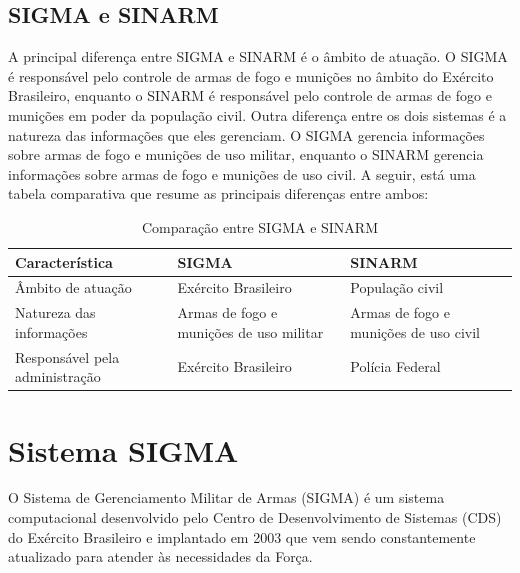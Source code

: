 \subsection{SIGMA e SINARM}
A principal diferença entre SIGMA e SINARM é o âmbito de atuação. O SIGMA é responsável pelo controle de armas de fogo e munições no âmbito do Exército Brasileiro, enquanto o SINARM é responsável pelo controle de armas de fogo e munições em poder da população civil.
Outra diferença entre os dois sistemas é a natureza das informações que eles gerenciam. O SIGMA gerencia informações sobre armas de fogo e munições de uso militar, enquanto o SINARM gerencia informações sobre armas de fogo e munições de uso civil.
A seguir, está uma tabela comparativa que resume as principais diferenças entre ambos: 
\begin{table}[ht]
	\centering
	\caption{Comparação entre SIGMA e SINARM}
	\begin{tabularx}{\textwidth}{lXp{5cm}}
	  \toprule
	  Característica & SIGMA & SINARM \\
	  \midrule
	  Âmbito de atuação & Exército Brasileiro & População civil \\
	  Natureza das informações & Armas de fogo e munições de uso militar & Armas de fogo e munições de uso civil \\
	  Responsável pela administração & Exército Brasileiro & Polícia Federal \\
	  \bottomrule
	\end{tabularx}
  \end{table}

  

\section{ Sistema SIGMA } 
O Sistema de Gerenciamento Militar de Armas (SIGMA) é um sistema computacional desenvolvido pelo Centro de Desenvolvimento de Sistemas (CDS) do Exército Brasileiro e  implantado em 2003 que vem sendo constantemente atualizado para atender às necessidades da Força.\cite{fenemeReunixE3oSobre}

